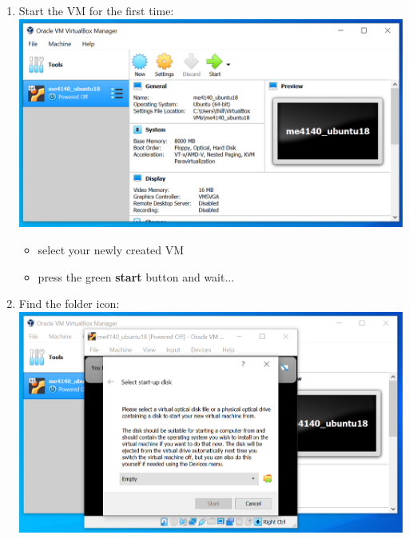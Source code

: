 \documentclass[12pt]{article}
\begin{document}
\begin{description}
\begin{description}
\begin{enumerate}
\item Start the VM for the first time: \vspace{5mm} \\
      		\hspace*{-2.5cm}\includegraphics[scale=.6]{Capture9.png}\\
            \begin{itemize}
                    
                 \item select your newly created VM      
                 \item press the green {\bf start} button and wait...
     
            \end{itemize}
\vspace{10mm}
\item Find the folder icon: \vspace{5mm} \\
      		\hspace*{-2.5cm}\includegraphics[scale=.6]{Capture10.png}\\
            \begin{itemize}
                    

\end{itemize}
\end{enumerate}
\end{description}
\end{description}
\end{document}
